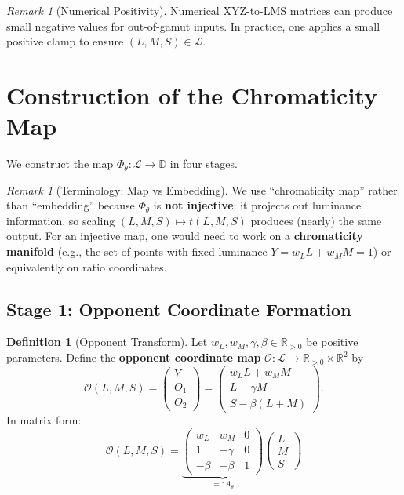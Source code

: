 \documentclass[11pt]{article}
\theoremstyle{plain}
\theoremstyle{definition}
\newtheorem{definition}[theorem]{Definition}
\theoremstyle{remark}
\newtheorem{remark}[theorem]{Remark}
\newcommand{\R}{\mathbb{R}}
\newcommand{\Rpp}{\mathbb{R}_{> 0}}     %
\newcommand{\D}{\mathbb{D}}
\begin{document}
\begin{remark}[Numerical Positivity]
\label{rem:positivity}
Numerical XYZ-to-LMS matrices can produce small negative values for out-of-gamut inputs. In practice, one applies a small positive clamp to ensure $(L, M, S) \in \mathcal{L}$.
\end{remark}

\section{Construction of the Chromaticity Map}
\label{sec:construction}

We construct the map $\Phi_\theta: \mathcal{L} \to \D$ in four stages.

\begin{remark}[Terminology: Map vs Embedding]
\label{rem:terminology}
We use ``chromaticity map'' rather than ``embedding'' because $\Phi_\theta$ is \textbf{not injective}: it projects out luminance information, so scaling $(L, M, S) \mapsto t(L, M, S)$ produces (nearly) the same output. For an injective map, one would need to work on a \textbf{chromaticity manifold} (e.g., the set of points with fixed luminance $Y = w_L L + w_M M = 1$) or equivalently on ratio coordinates.
\end{remark}

\subsection{Stage 1: Opponent Coordinate Formation}

\begin{definition}[Opponent Transform]
\label{def:opponent}
Let $w_L, w_M, \gamma, \beta \in \Rpp$ be positive parameters. Define the \textbf{opponent coordinate map} $\mathcal{O}: \mathcal{L} \to \Rpp \times \R^2$ by
\begin{equation}
\mathcal{O}(L, M, S) = \begin{pmatrix} Y \\ O_1 \\ O_2 \end{pmatrix} = \begin{pmatrix} w_L L + w_M M \\ L - \gamma M \\ S - \beta(L + M) \end{pmatrix}.
\end{equation}
In matrix form:
\begin{equation}
\boxed{
\mathcal{O}(L, M, S) = \underbrace{\begin{pmatrix} w_L & w_M & 0 \\ 1 & -\gamma & 0 \\ -\beta & -\beta & 1 \end{pmatrix}}_{=: A_\theta} \begin{pmatrix} L \\ M \\ S \end{pmatrix}
}
\end{equation}
\end{definition}
\end{document}
